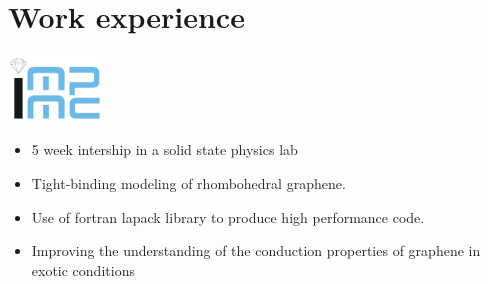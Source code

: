 \section{Work experience}

\noindent
\begin{minipage}{.15\textwidth}
\centerline{\includegraphics[width=25mm]{img/impmc}}
\end{minipage}%
\hspace{5mm}
\begin{minipage}{.8\textwidth}
\raggedright
    \begin{itemize}
        \itemsep0em
        \item 5 week intership in a solid state physics lab
        \item Tight-binding modeling of rhombohedral graphene.
        \item Use of fortran lapack library to produce high performance code.
		\item Improving the understanding of the conduction properties of graphene in exotic conditions
    \end{itemize}
\end{minipage}

